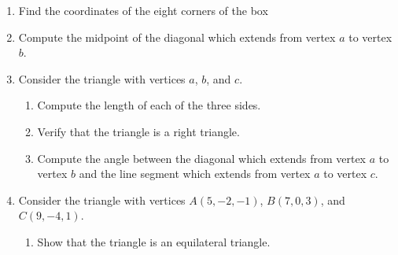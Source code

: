 \documentclass[12pt]{article}
\newif\ifans
\begin{document}
\begin{enumerate}

\item Find the coordinates of the eight corners of the box

\ifans{\fbox{$(1,2,0), (3,2,0), (3,5,0), (1,5,0), (1,2,1), (3,2,1), (3,5,1), (1,5,1)$}} \fi

\item Compute the midpoint of the diagonal which extends from vertex $a$ to vertex $b$.

\ifans{\fbox{$\left(2,\frac{7}{2},\frac{1}{2}\right)$}} \fi

\item Consider the triangle with vertices $a$, $b$, and $c$.

\begin{enumerate}

\item Compute the length of each of the three sides.

\ifans{\fbox{\parbox{0.8\linewidth}{The diagonal from vertex $a$ to vertex $b$ has length $\sqrt{14}$;\\
The line segment from vertex $a$ to vertex $c$ has length $\sqrt{13}$;\\
The line segment from vertex $c$ to vertex $b$ has length 1.}}} \fi

\item Verify that the triangle is a right triangle.

\ifans{\fbox{\parbox{1\linewidth}{Notice that $\left(\sqrt{13}\right)^2+1^2=\left(\sqrt{14}\right)^2$.  So, the sides of the triangle (which are not collinear) satisfy the Pythagorean Theorem.  Thus, the triangle is a right triangle.}}} \fi

\item Compute the angle between the diagonal which extends from vertex $a$ to vertex $b$ and the line segment which extends from vertex $a$ to vertex $c$.

\ifans{\fbox{$\cos^{-1}\left(\frac{\sqrt{13}}{\sqrt{14}}\right)$}} \fi

\end{enumerate}

\item Consider the triangle with vertices $A(5,-2,-1)$, $B(7,0,3)$, and $C(9,-4,1)$.

\begin{enumerate}

\item Show that the triangle is an equilateral triangle.


\end{enumerate}
\end{enumerate}
\end{document}
